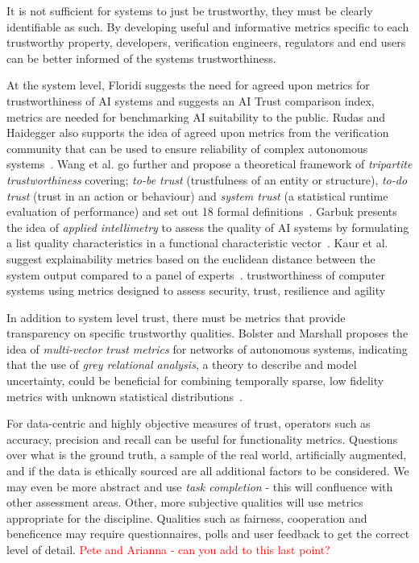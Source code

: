 It is not sufficient for systems to just be trustworthy, they must be clearly identifiable as such. By developing useful and informative metrics specific to each trustworthy property, developers, verification engineers, regulators and end users can be better informed of the systems trustworthiness.

At the system level, Floridi suggests the need for agreed upon metrics for trustworthiness of AI systems and suggests an  AI Trust comparison index, metrics are needed for benchmarking AI suitability to the public. 
%
Rudas and Haidegger also supports the idea of agreed upon metrics from the verification community that can be used to ensure reliability of complex autonomous systems~\cite{Rudas2020}. Wang et al. go further and propose a  theoretical framework of \emph{tripartite trustworthiness} covering; \emph{to-be trust} (trustfulness of an entity or structure), \emph{to-do trust} (trust in an action or behaviour) and \emph{system trust} (a statistical runtime evaluation of performance) and set out 18 formal definitions~\cite{Wang2020}. 
%
Garbuk presents the idea of \emph{applied intellimetry} to assess the quality of AI systems by formulating a list quality characteristics in a functional characteristic vector~\cite{garbuk2018intellimetry}. 
%
Kaur et al. suggest explainability metrics based on the euclidean distance between the system output compared to a panel of experts~\cite{kaur2021trustworthy}. 
%
trustworthiness of computer systems using metrics designed to assess security, trust, resilience and agility~\cite{cho2019stram}


In addition to system level trust, there must be metrics that provide transparency on specific trustworthy qualities. 
%
Bolster and Marshall proposes the idea of \emph{multi-vector trust metrics} for networks of autonomous systems, indicating that the use of \emph{grey relational analysis}, a theory to describe and model uncertainty, could be beneficial for combining temporally sparse, low fidelity metrics with unknown statistical distributions~\cite{Bolster2014}. 

For data-centric and highly objective measures of trust, operators such as accuracy, precision and recall can be useful for functionality metrics. Questions over what is the ground truth, a sample of the real world, artificially augmented, and if the data is ethically sourced are all additional factors to be considered. We may even be more abstract and use \emph{task completion} - this will confluence with other assessment areas. 
%
Other, more subjective qualities will use metrics appropriate for the discipline. Qualities such as fairness, cooperation and beneficence may require questionnaires, polls and user feedback to get the correct level of detail. 
%
\textcolor{red}{Pete and Arianna - can you add to this last point?}




